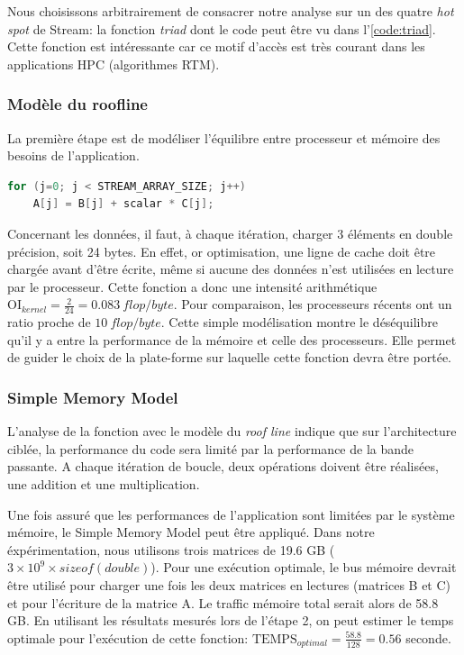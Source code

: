 Nous choisissons arbitrairement de consacrer notre analyse sur un des quatre \textit{hot spot} de Stream: la fonction \textit{triad} dont le code peut être vu dans l'\autoref{code:triad}. Cette fonction est intéressante car ce motif d'accès est très courant dans les applications HPC (algorithmes RTM).

\subsubsection{Modèle du roofline}
La première étape est de modéliser l'équilibre entre processeur et mémoire des besoins de l'application. 

\begin{lstlisting}[language=c,caption= La fonction triad du benchmark Stream utilise trois matrices: deux en lecture et une en écriture,label={code:triad}, 
  basicstyle=\footnotesize, frame=tb,
  xleftmargin=.065\textwidth, xrightmargin=.065\textwidth]
for (j=0; j < STREAM_ARRAY_SIZE; j++)
    A[j] = B[j] + scalar * C[j];
\end{lstlisting}


Concernant les données, il faut, à chaque itération, charger 3 éléments en double précision, soit 24 bytes. En effet, or optimisation, une ligne de cache doit être chargée avant d'être écrite, même si aucune des données n'est utilisées en lecture par le processeur. Cette fonction a donc une intensité arithmétique $\text{OI}_{kernel} = \frac{2}{24} = 0.083\ flop/byte$.
Pour comparaison, les processeurs récents ont un ratio proche de $10\ flop/byte$. Cette simple modélisation montre le déséquilibre qu'il y a entre la performance de la mémoire et celle des processeurs. Elle permet de guider le choix de la plate-forme sur laquelle cette fonction devra être portée.



\subsubsection{Simple Memory Model}
L'analyse de la fonction avec le modèle du \textit{roof line} indique que sur l'architecture ciblée, la performance du code sera limité par la performance de la bande passante.
A chaque itération de boucle, deux opérations doivent être réalisées, une addition et une multiplication. 

Une fois assuré que les performances de l'application sont limitées par le système mémoire, le Simple Memory Model peut être appliqué. Dans notre éxpérimentation, nous utilisons trois matrices de 19.6 GB ($3 \times 10^9 \times sizeof(double)$). Pour une exécution optimale, le bus mémoire devrait être utilisé pour charger une fois les deux matrices en lectures (matrices B et C)  et pour l'écriture de la matrice A. Le traffic mémoire total serait alors de 58.8 GB. En utilisant les résultats mesurés lors de l'étape 2, on peut estimer le temps optimale pour l'exécution de cette fonction: $\text{TEMPS}_{optimal} = \frac{58.8}{128} = 0.56$ seconde.









